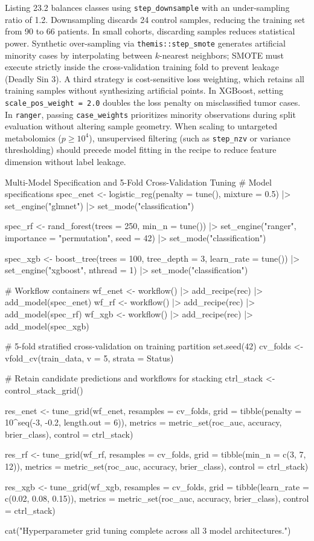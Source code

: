 \documentclass[11pt,oneside]{book}
\begin{document}
Listing 23.2 balances classes using \texttt{step\_downsample} with an under-sampling ratio of 1.2. Downsampling discards 24 control samples, reducing the training set from 90 to 66 patients. In small cohorts, discarding samples reduces statistical power. Synthetic over-sampling via \texttt{themis::step\_smote} generates artificial minority cases by interpolating between $k$-nearest neighbors; SMOTE must execute strictly inside the cross-validation training fold to prevent leakage (Deadly Sin 3). A third strategy is cost-sensitive loss weighting, which retains all training samples without synthesizing artificial points. In XGBoost, setting \texttt{scale\_pos\_weight = 2.0} doubles the loss penalty on misclassified tumor cases. In \texttt{ranger}, passing \texttt{case\_weights} prioritizes minority observations during split evaluation without altering sample geometry. When scaling to untargeted metabolomics ($p \ge 10^4$), unsupervised filtering (such as \texttt{step\_nzv} or variance thresholding) should precede model fitting in the recipe to reduce feature dimension without label leakage.

\begin{rchunk}{Multi-Model Specification and 5-Fold Cross-Validation Tuning}
# Model specifications
spec_enet <- logistic_reg(penalty = tune(), mixture = 0.5) |>
  set_engine("glmnet") |>
  set_mode("classification")

spec_rf <- rand_forest(trees = 250, min_n = tune()) |>
  set_engine("ranger", importance = "permutation", seed = 42) |>
  set_mode("classification")

spec_xgb <- boost_tree(trees = 100, tree_depth = 3, learn_rate = tune()) |>
  set_engine("xgboost", nthread = 1) |>
  set_mode("classification")

# Workflow containers
wf_enet <- workflow() |> add_recipe(rec) |> add_model(spec_enet)
wf_rf   <- workflow() |> add_recipe(rec) |> add_model(spec_rf)
wf_xgb  <- workflow() |> add_recipe(rec) |> add_model(spec_xgb)

# 5-fold stratified cross-validation on training partition
set.seed(42)
cv_folds <- vfold_cv(train_data, v = 5, strata = Status)

# Retain candidate predictions and workflows for stacking
ctrl_stack <- control_stack_grid()

res_enet <- tune_grid(wf_enet, resamples = cv_folds,
                      grid = tibble(penalty = 10^seq(-3, -0.2, length.out = 6)),
                      metrics = metric_set(roc_auc, accuracy, brier_class),
                      control = ctrl_stack)

res_rf <- tune_grid(wf_rf, resamples = cv_folds,
                    grid = tibble(min_n = c(3, 7, 12)),
                    metrics = metric_set(roc_auc, accuracy, brier_class),
                    control = ctrl_stack)

res_xgb <- tune_grid(wf_xgb, resamples = cv_folds,
                     grid = tibble(learn_rate = c(0.02, 0.08, 0.15)),
                     metrics = metric_set(roc_auc, accuracy, brier_class),
                     control = ctrl_stack)

cat("Hyperparameter grid tuning complete across all 3 model architectures.\n")
\end{rchunk}
\end{document}
